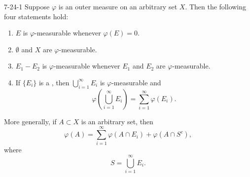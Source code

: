 \documentclass[../main.tex]{subfiles}
\begin{document}
\begin{theorem}{}{7-24-1}
Suppose $\varphi$ is an outer measure on an arbitrary set $X$.
Then the following four statements hold:
\begin{enumerate}
\item[(i)] $E$ is $\varphi$-measurable whenever $\varphi(E) = 0$.
\item[(ii)] $\emptyset$ and $X$ are $\varphi$-measurable.
\item[(iii)] $E_1 - E_2$ is $\varphi$-measurable whenever $E_1$ and $E_2$ are $\varphi$-measurable.
\item[(iv)] If $\{E_i\}$ is a , then $\bigcup_{i=1}^\infty E_i$ is $\varphi$-measurable and
\[
\varphi\left(\bigcup_{i=1}^\infty E_i\right) = \sum_{i=1}^\infty \varphi(E_i).
\]
\end{enumerate}
More generally, if $A \subset X$ is an arbitrary set, then
\[
\varphi(A) = \sum_{i=1}^\infty \varphi(A \cap E_i) + \varphi(A \cap S^{c}),
\]
where
\[
S = \bigcup_{i=1}^\infty E_i.
\]
\end{theorem}
\end{document}
